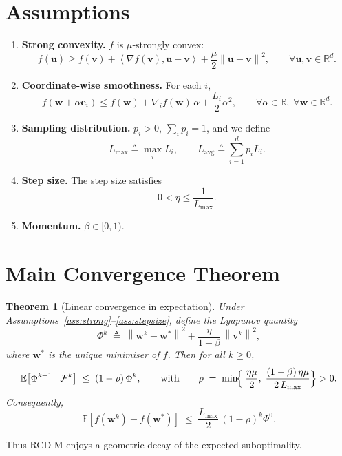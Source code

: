 \documentclass{article}
\newtheorem{theorem}{Theorem}
\newcommand{\E}{\mathbb{E}}
\newcommand{\R}{\mathbb{R}}
\newcommand{\norm}[1]{\left\|#1\right\|}
\newcommand{\ip}[2]{\left\langle #1,#2\right\rangle}
\begin{document}
\section*{Assumptions}
\begin{enumerate}
    \item \textbf{Strong convexity.} $f$ is $\mu$‑strongly convex:
    \[
        f(\mathbf u)\ge f(\mathbf v)+\ip{\nabla f(\mathbf v)}{\mathbf u-\mathbf v}
        +\frac{\mu}{2}\norm{\mathbf u-\mathbf v}^{2},
        \qquad\forall\mathbf u,\mathbf v\in\R^{d}.
    \] \label{ass:strong}
    \item \textbf{Coordinate‑wise smoothness.} For each $i$,
    \[
        f(\mathbf w+ \alpha\mathbf e_i)\le f(\mathbf w)+\nabla_i f(\mathbf w)\,\alpha+\frac{L_i}{2}\alpha^{2},
        \qquad\forall\alpha\in\R,\;\forall\mathbf w\in\R^{d}.
    \] \label{ass:smooth}
    \item \textbf{Sampling distribution.} $p_i>0$, $\sum_{i}p_i=1$, and we define
    \[
        L_{\max}\triangleq\max_{i}L_i,\qquad
        L_{\mathrm{avg}}\triangleq\sum_{i=1}^{d}p_iL_i .
    \] \label{ass:prob}
    \item \textbf{Step size.} The step size satisfies
    \[
        0<\eta\le\frac{1}{L_{\max}}.
    \] \label{ass:stepsize}
    \item \textbf{Momentum.} $\beta\in[0,1)$.
\end{enumerate}

\section*{Main Convergence Theorem}
\begin{theorem}[Linear convergence in expectation]\label{thm:linear}
Under Assumptions~\ref{ass:strong}–\ref{ass:stepsize}, define the Lyapunov quantity
\[
    \Phi^{k}\;\triangleq\;\norm{\mathbf w^{k}-\mathbf w^{*}}^{2}
    +\frac{\eta}{1-\beta}\,\norm{\mathbf v^{k}}^{2},
\]
where $\mathbf w^{*}$ is the unique minimiser of $f$.  
Then for all $k\ge0$,
\[
    \E\!\left[\Phi^{k+1}\mid\mathcal F^{k}\right]
    \;\le\;\left(1-\rho\right)\Phi^{k},
    \qquad\text{with}\qquad
    \rho\;=\;\min\!\Bigl\{\;\frac{\eta\mu}{2},
    \; \frac{(1-\beta)\,\eta\mu}{2\,L_{\max}}\Bigr\}>0 .
\]
Consequently,
\[
    \E\!\left[f(\mathbf w^{k})-f(\mathbf w^{*})\right]
    \;\le\;\frac{L_{\max}}{2}\,(1-\rho)^{k}\Phi^{0}.
\]
\end{theorem}
Thus RCD‑M enjoys a geometric decay of the expected suboptimality.
\end{document}
